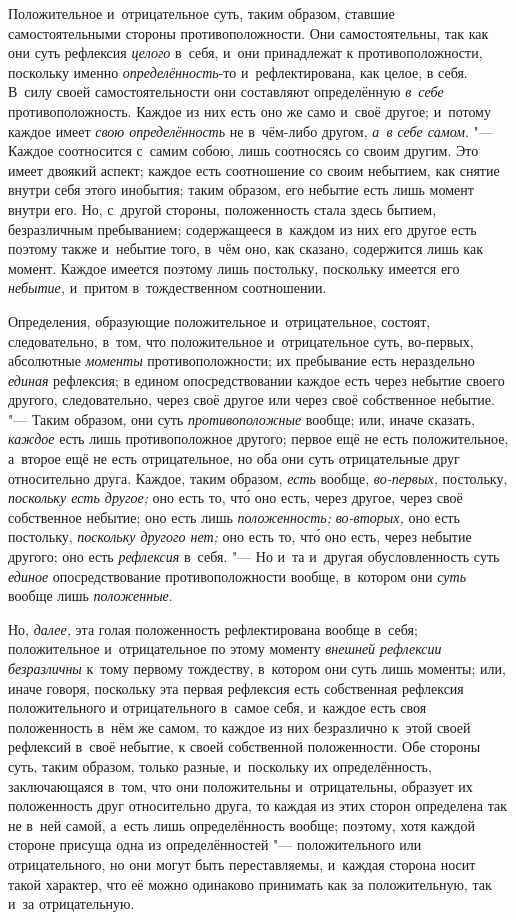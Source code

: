 Положительное и~отрицательное суть, таким образом, ставшие самостоятельными
стороны противоположности. Они самостоятельны, так как они суть рефлексия
{\em целого} в~себя, и~они принадлежат к
противоположности, поскольку именно
{\em определённость}-то и~рефлектирована, как целое,
в себя. В~силу своей самостоятельности они составляют определённую
{\em в~себе} противоположность. Каждое из них есть оно
же само и~своё другое; и~потому каждое имеет {\em свою
определённость} не в~чём-либо другом, {\em а~в себе
самом}. "--- Каждое соотносится с~самим собою, лишь соотносясь со своим
другим. Это имеет двоякий аспект; каждое есть соотношение со своим
небытием, как снятие внутри себя этого инобытия; таким образом, его небытие
есть лишь момент внутри его. Но, с~другой стороны, положенность стала здесь
бытием, безразличным пребыванием; содержащееся в~каждом из них его другое
есть поэтому также и~небытие того, в~чём оно, как сказано, содержится лишь
как момент. Каждое имеется поэтому лишь постольку, поскольку имеется его
{\em небытие,} и~притом в~тождественном соотношении.

Определения, образующие положительное и~отрицательное, состоят,
следовательно, в~том, что положительное и~отрицательное суть, во-первых,
абсолютные {\em моменты} противоположности; их
пребывание есть нераздельно {\em единая} рефлексия; в
едином опосредствовании каждое есть через небытие своего другого,
следовательно, через своё другое или через своё собственное небытие. "---
Таким образом, они суть {\em противоположные} вообще;
или, иначе сказать, {\em каждое} есть лишь
противоположное другого; первое ещё не есть положительное, а~второе ещё не
есть отрицательное, но оба они суть отрицательные друг относительно друга.
Каждое, таким образом, {\em есть} вообще,
{\em во-первых,} постольку,
{\em поскольку есть другое;} оно есть то, чт\'{о} оно есть,
через другое, через своё собственное небытие; оно есть лишь
{\em положенность;} {\em во-вторых,} оно есть постольку,
{\em поскольку другого нет;} оно есть то, чт\'{о} оно есть,
через небытие другого; оно есть {\em рефлексия} в~себя.
"--- Но и~та и~другая обусловленность суть {\em единое}
опосредствование противоположности вообще, в~котором они
{\em суть} вообще лишь {\em положенные}.

Но, {\em далее,} эта голая положенность рефлектирована
вообще в~себя; положительное и~отрицательное по этому моменту
{\em внешней рефлексии безразличны} к~тому первому
тождеству, в~котором они суть лишь моменты; или, иначе говоря, поскольку
эта первая рефлексия есть собственная рефлексия положительного и
отрицательного в~самое себя, и~каждое есть своя положенность в~нём же
самом, то каждое из них безразлично к~этой своей рефлексий в~своё небытие,
к своей собственной положенности. Обе стороны суть, таким образом, только
разные, и~поскольку их определённость, заключающаяся в~том, что они
положительны и~отрицательны, образует их положенность друг относительно
друга, то каждая из этих сторон определена так не в~ней самой, а~есть лишь
определённость вообще; поэтому, хотя каждой стороне присуща одна из
определённостей "--- положительного или отрицательного, но они могут быть
переставляемы, и~каждая сторона носит такой характер, что её можно
одинаково принимать как за положительную, так и~за отрицательную.

